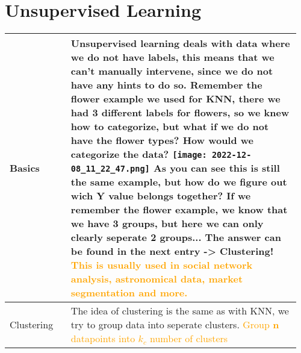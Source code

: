 \documentclass[main.tex,fontsize=8pt,paper=a4,paper=portrait,DIV=calc,]{scrartcl}
\begin{document}
\begin{table}[ht!]
\section{Unsupervised Learning}
\begin{tabular}{|m{0.2\linewidth}|m{0.755\linewidth}|}
\hline
Basics & 
Unsupervised learning deals with data where we do not have labels, this means that we can't manually intervene, since we do not have any hints to do so.\newline
Remember the flower example we used for KNN, there we had 3 different labels for flowers, so we knew how to categorize, but what if we do not have the flower types? How would we categorize the data?\newline 
\texttt{[image: 2022-12-08\_11\_22\_47.png]}\newline
As you can see this is still the same example, but how do we figure out wich Y value belongs together? If we remember the flower example, we know that we have 3 groups, but here we can only clearly seperate 2 groups... The answer can be found in the next entry -> \textbf{Clustering!}
\textcolor{orange}{This is usually used in social network analysis, astronomical data, market segmentation and more.}\\
\hline
Clustering & 
The idea of clustering is the same as with KNN, we try to group data into seperate clusters.\newline
\textcolor{orange}{Group \textbf{n} datapoints into \textbf{\(k_c\)} number of clusters}\newline
\\
\hline
\end{tabular}
\end{table}
\pagebreak
\end{document}
